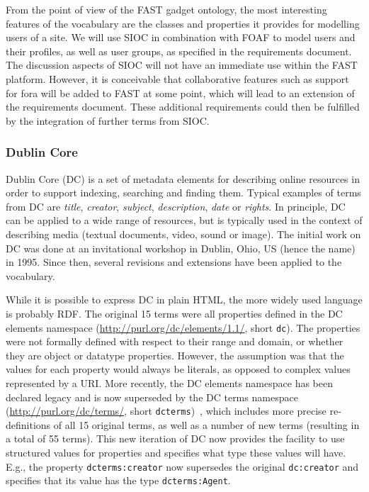 \documentclass{fast_latex}
\begin{document}
From the point of view of the FAST gadget ontology, the most interesting features of the vocabulary are the classes and properties it provides for modelling users of a site. We will use SIOC in combination with FOAF to model users and their profiles, as well as user groups, as specified in the requirements document. The discussion aspects of SIOC will not have an immediate use within the FAST platform. However, it is conceivable that collaborative features such as support for fora will be added to FAST at some point, which will lead to an extension of the requirements document. These additional requirements could then be fulfilled by the integration of further terms from SIOC.

\subsubsection{Dublin Core} %
\label{ssub:dublin_core}

Dublin Core (DC) is a set of metadata elements for describing online resources in order to support indexing, searching and finding them. Typical examples of terms from DC are \emph{title}, \emph{creator}, \emph{subject}, \emph{description}, \emph{date} or \emph{rights}. In principle, DC can be applied to a wide range of resources, but is typically used in the context of describing media (textual documents, video, sound or image). The initial work on DC was done at an invitational workshop in Dublin, Ohio, US (hence the name) in 1995. Since then, several revisions and extensions have been applied to the vocabulary.

While it is possible to express DC in plain HTML, the more widely used language is probably RDF. The original 15 terms were all properties defined in the DC elements namespace (\url{http://purl.org/dc/elements/1.1/}, short \texttt{dc}). The properties were not formally defined with respect to their range and domain, or whether they are object or datatype properties. However, the assumption was that the values for each property would always be literals, as opposed to complex values represented by a URI. More recently, the DC elements namespace has been declared legacy and is now superseded by the DC terms namespace (\url{http://purl.org/dc/terms/}, short \texttt{dcterms})~\cite{dcterms2008}, which includes more precise re-definitions of all 15 original terms, as well as a number of new terms (resulting in a total of 55 terms). This new iteration of DC now provides the facility to use structured values for properties and specifies what type these values will have. E.g., the property \texttt{dcterms:creator} now supersedes the original \texttt{dc:creator} and specifies that its value has the type \texttt{dcterms:Agent}.
\end{document}
